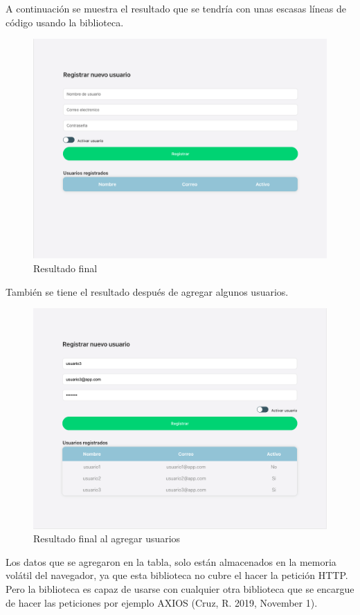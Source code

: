 A continuación se muestra el resultado que se tendría con unas escasas líneas de código usando la biblioteca.
\newline
\begin{figure}[H]
    \includegraphics[width=1\textwidth]{./Imagenes/9.10}
   \centering 
    \caption[Resultado final]{Resultado final}
    \end{figure}
\newline
También se tiene el resultado después de agregar algunos usuarios.
\newline
\begin{figure}[H]
    \includegraphics[width=1\textwidth]{./Imagenes/9.11}
   \centering 
    \caption[Resultado final al agregar usuarios]{Resultado final al agregar usuarios}
    \end{figure}
\newline
Los datos que se agregaron en la tabla, solo están almacenados en la memoria volátil del navegador, ya que esta biblioteca no cubre el hacer la petición HTTP. Pero la biblioteca es capaz de usarse con cualquier otra biblioteca que se encargue de hacer las peticiones por ejemplo AXIOS \cite{axios} (Cruz, R. 2019, November 1).


